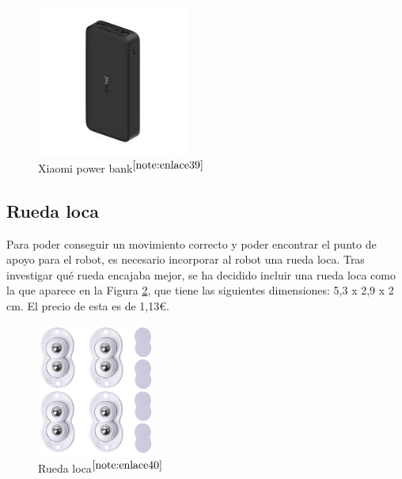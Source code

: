 \begin{figure} [h!]
	\begin{center}
		\includegraphics[width=5cm]{figs/powerbank.png}
	\end{center}
	\caption{Xiaomi power bank$^{\ref{note:enlace39}}$} 
	\label{fig:powerbank}
\end{figure}

\setcounter{footnote}{39} %

\subsection{Rueda loca}
\label{subsec:ruedaloca}

Para poder conseguir un movimiento correcto y poder encontrar el punto de apoyo para el robot, es necesario incorporar al robot una rueda loca. Tras investigar qué rueda encajaba mejor, se ha decidido incluir una rueda loca como la que aparece en la Figura \ref{fig:ruedaloca}, que tiene las siguientes dimensiones: 5,3 x 2,9 x 2 cm. El precio de esta es de 1,13€.

\begin{figure} [h!]
	\begin{center}
		\includegraphics[width=4cm]{figs/ruedaloca.png}
	\end{center}
	\caption{Rueda loca$^{\ref{note:enlace40}}$} 
	\label{fig:ruedaloca}
\end{figure}

